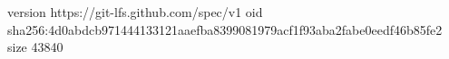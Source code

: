 version https://git-lfs.github.com/spec/v1
oid sha256:4d0abdcb971444133121aaefba8399081979acf1f93aba2fabe0eedf46b85fe2
size 43840
